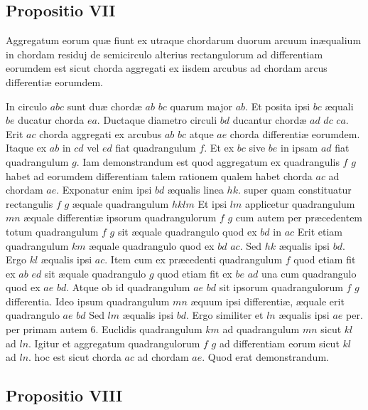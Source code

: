 \documentclass[11pt,a4paper]{article}
\begin{document}
\subsection*{Propositio VII}

Aggregatum eorum quæ fiunt ex utraque chordarum duorum arcuum inæqualium in chordam residuj de semicirculo alterius rectangulorum ad differentiam eorumdem est sicut chorda aggregati ex iisdem arcubus ad chordam arcus differentiæ eorumdem.

In circulo $abc$ sunt duæ chordæ $ab$ $bc$ quarum major $ab$. Et posita ipsi $bc$ æquali $be$ ducatur chorda $ea$. Ductaque diametro circuli $bd$ ducantur chordæ $ad$ $dc$ $ca$. Erit $ac$ chorda aggregati ex arcubus $ab$ $bc$ atque $ae$ chorda differentiæ eorumdem. Itaque ex $ab$ in $cd$ vel $ed$ fiat quadrangulum $f$. Et ex $bc$ sive $be$ in ipsam $ad$ fiat quadrangulum $g$. Iam demonstrandum est quod aggregatum ex quadrangulis $f$ $g$ habet ad eorumdem differentiam talem rationem qualem habet chorda $ac$ ad chordam $ae$. Exponatur enim ipsi $bd$ æqualis linea $hk$. super quam constituatur rectangulis $f$ $g$ æquale quadrangulum $hklm$ Et ipsi $lm$ applicetur quadrangulum $mn$ æquale differentiæ ipsorum quadrangulorum $f$ $g$ cum autem per præcedentem totum quadrangulum $f$ $g$ sit æquale quadrangulo quod ex $bd$ in $ac$ Erit etiam quadrangulum $km$ æquale quadrangulo quod ex $bd$ $ac$. Sed $hk$ æqualis ipsi $bd$. Ergo $kl$ æqualis ipsi $ac$. Item cum ex præcedenti quadrangulum $f$ quod etiam fit ex $ab$ $ed$ sit æquale quadrangulo $g$ quod etiam fit ex $be$ $ad$ una cum quadrangulo quod ex $ae$ $bd$. Atque ob id quadrangulum $ae$ $bd$ sit ipsorum quadrangulorum $f$ $g$ differentia. Ideo ipsum quadrangulum $mn$ æquum ipsi differentiæ, æquale erit quadrangulo $ae$ $bd$ Sed $lm$ æqualis ipsi $bd$. Ergo similiter et $ln$ æqualis ipsi $ae$ per. per primam autem 6. Euclidis quadrangulum $km$ ad quadrangulum $mn$ sicut $kl$ ad $ln$. Igitur et aggregatum quadrangulorum $f$ $g$ ad differentiam eorum sicut $kl$ ad $ln$. hoc est sicut chorda $ac$ ad chordam $ae$. Quod erat demonstrandum.

\subsection*{Propositio VIII}
\end{document}
